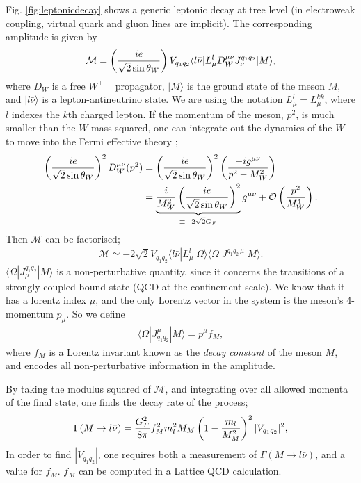 Fig. \ref{fig:leptonicdecay} shows a generic leptonic decay at tree level (in electroweak coupling, virtual quark and gluon lines are implicit). The corresponding amplitude is given by
\begin{align}
  \mathcal{M} = \left({ie\over \sqrt{2}\sin\theta_W}\right) V_{q_1q_2} \langle l\bar{\nu} | L^l_{\mu} D_W^{\mu\nu} J_{\nu}^{q_1q_2} | M \rangle,
\end{align}
where $D_{W}$ is a free $W^{+-}$ propagator, $|M\rangle$ is the ground state of the meson $M$, and $|l\bar{\nu}\rangle$ is a lepton-antineutrino state. We are using the notation $L^l_{\mu}=L^{kk}_{\mu}$, where $l$ indexes the $k$th charged lepton. If the momentum of the meson, $p^2$, is much smaller than the $W$ mass squared, one can integrate out the dynamics of the $W$ to move into the Fermi effective theory \cite{Borasoy:2007yi};
\begin{align}
  \nonumber
  \left({ie\over\sqrt{2}\sin\theta_W}\right)^2 D^{\mu\nu}_W(p^2) &= \left({ie\over\sqrt{2}\sin\theta_W}\right)^2 \left( -ig^{\mu\nu} \over p^2 - M_W^2 \right)
  \\ & = \underbrace{ {i\over M_W^2} \left( ie \over \sqrt{2}\sin\theta_W \right)^2  }_{\equiv -2\sqrt{2}G_F} g^{\mu\nu} + \mathcal{O}\left({p^2\over M_W^4}\right).
\end{align}
Then $\mathcal{M}$ can be factorised;
\begin{align}
  \mathcal{M} \simeq -2\sqrt{2} V_{q_1q_2} \langle l\bar{\nu} | L_{\mu}^l | \Omega \rangle \langle \Omega | J^{q_1q_2\, \mu} | M \rangle.
\end{align}
$\langle \Omega | J^{q_1q_2}_{\mu}| M \rangle$ is a non-perturbative quantity, since it concerns the transitions of a strongly coupled bound state (QCD at the confinement scale). We know that it has a lorentz index $\mu$, and the only Lorentz vector in the system is the meson's 4-momentum $p_{\mu}$. So we define
\begin{align}
  \langle\Omega | J_{q_1q_2}^{\mu} | M \rangle = p^{\mu} f_M,
  \label{eq:decay_constant_def}
\end{align}
where $f_M$ is a Lorentz invariant known as the {\it{decay constant}} of the meson $M$, and encodes all non-perturbative information in the amplitude.

By taking the modulus squared of $\mathcal{M}$, and integrating over all allowed momenta of the final state, one finds the decay rate of the process;
\begin{align}
  \Gamma(M\to l\bar{\nu}) = {G_F^2\over 8\pi} f_M^2 m_l^2 M_M \left( 1 - {m_l\over M_M^2} \right)^2 |V_{q_1q_2}|^2,
\end{align}
In order to find $|V_{q_1q_2}|$, one requires both a measurement of $\Gamma(M\to l\bar{\nu})$, and a value for $f_M$. $f_M$ can be computed in a Lattice QCD calculation.

